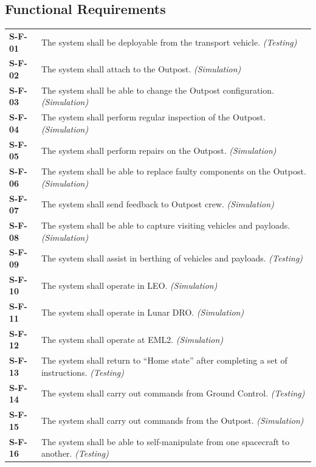 \documentclass[12pt, letterpaper]{article}
\begin{document}
\subsection{Functional Requirements}
\captionsetup[table]{list=no}
\begin{longtable}{P{1.5cm}P{14.25cm}}
\textbf{S-F-01}	& The system shall be deployable from the transport vehicle. \textit{(Testing)}											\\
\textbf{S-F-02}	& The system shall attach to the Outpost. \textit{(Simulation)}												\\
\textbf{S-F-03}	& The system shall be able to change the Outpost configuration. \textit{(Simulation)}									\\
\textbf{S-F-04}	& The system shall perform regular inspection of the Outpost. \textit{(Simulation)}										\\
\textbf{S-F-05}	& The system shall perform repairs on the Outpost. \textit{(Simulation)}												\\
\textbf{S-F-06}	& The system shall be able to replace faulty components on the Outpost. \textit{(Simulation)}							\\
\textbf{S-F-07}	& The system shall send feedback to Outpost crew. \textit{(Simulation)}												\\
\textbf{S-F-08}	& The system shall be able to capture visiting vehicles and payloads. \textit{(Simulation)}									\\
\textbf{S-F-09}	& The system shall assist in berthing of vehicles and payloads. \textit{(Testing)}											\\
\textbf{S-F-10}	& The system shall operate in LEO. \textit{(Simulation)} 																	\\
\textbf{S-F-11}	& The system shall operate in Lunar DRO. \textit{(Simulation)}												\\
\textbf{S-F-12}	& The system shall operate at EML2. \textit{(Simulation)}												\\
\textbf{S-F-13}	& The system shall return to “Home state” after completing a set of instructions. \textit{(Testing)}					\\
\textbf{S-F-14}	& The system shall carry out commands from Ground Control. \textit{(Testing)}											\\
\textbf{S-F-15}	& The system shall carry out commands from the Outpost. \textit{(Simulation)}												\\
\textbf{S-F-16}	& The system shall be able to self-manipulate from one spacecraft to another. \textit{(Testing)}							\\

\end{longtable}
\end{document}
